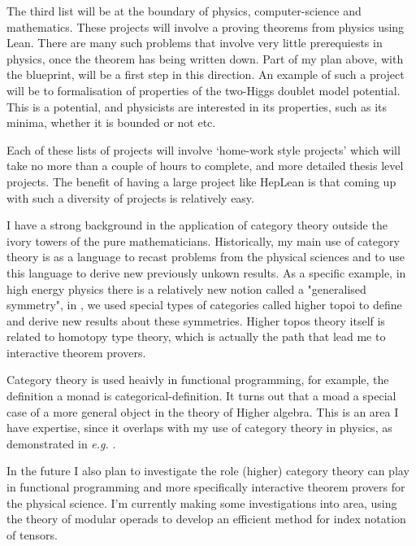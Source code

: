 \documentclass[12pt,letter]{article}
\newcounter{customtitle}
\begin{document}
The third list will be at the boundary of physics, computer-science and mathematics. These projects will involve a proving theorems from physics using Lean. There are many such problems that involve very little prerequiests in physics, once the theorem has being written down. Part of my plan above, with the blueprint, will be a first step in this direction. An example of such a project will be to formalisation of properties of the two-Higgs doublet model potential. 
This is a potential, and physicists are interested in its properties, 
such as its minima, whether it is bounded or not etc.

Each of these lists of projects will involve `home-work style projects' which will take no more than a couple of hours to complete, and more detailed thesis level projects. The benefit of having a large project like HepLean is that coming up with such a diversity of projects is relatively easy. 

 I have a strong background in the application of category theory 
outside the ivory towers of the pure mathematicians. Historically, my main use of category theory 
is as a language to recast problems from the physical sciences and to use this language 
to derive new previously unkown results. As a specific example, in high energy physics 
there is a relatively new notion called a "generalised symmetry", in  , 
we used special types of categories called higher topoi to define and derive new results 
about these symmetries. Higher topos theory itself is related to homotopy type theory, which is actually 
the path that lead me to interactive theorem provers. 

Category theory is used heaivly in functional programming, for example, the definition a monad is categorical-definition. It turns out that a moad 
a special case of a more general object in the theory of Higher algebra. 
This is an area I have expertise, since it overlaps with my use of category theory in physics, as demonstrated in \emph{e.g.} \js{}. 

In the future I also plan to investigate the role (higher) category theory can play in functional programming and more specifically interactive theorem provers for the physical science. I'm currently making some investigations into area, using the theory of modular operads to develop an efficient method for index notation of tensors. 
\end{document}
